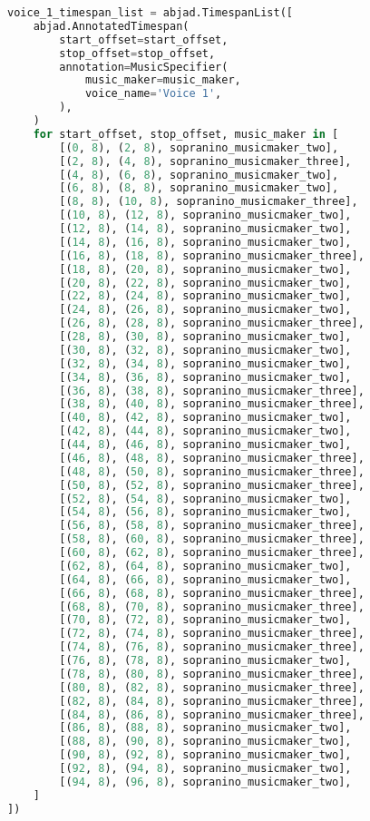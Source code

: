 \begin{lstlisting}[language=Python, caption=Invocation Source Code]
voice_1_timespan_list = abjad.TimespanList([
    abjad.AnnotatedTimespan(
        start_offset=start_offset,
        stop_offset=stop_offset,
        annotation=MusicSpecifier(
            music_maker=music_maker,
            voice_name='Voice 1',
        ),
    )
    for start_offset, stop_offset, music_maker in [
        [(0, 8), (2, 8), sopranino_musicmaker_two],
        [(2, 8), (4, 8), sopranino_musicmaker_three],
        [(4, 8), (6, 8), sopranino_musicmaker_two],
        [(6, 8), (8, 8), sopranino_musicmaker_two],
        [(8, 8), (10, 8), sopranino_musicmaker_three],
        [(10, 8), (12, 8), sopranino_musicmaker_two],
        [(12, 8), (14, 8), sopranino_musicmaker_two],
        [(14, 8), (16, 8), sopranino_musicmaker_two],
        [(16, 8), (18, 8), sopranino_musicmaker_three],
        [(18, 8), (20, 8), sopranino_musicmaker_two],
        [(20, 8), (22, 8), sopranino_musicmaker_two],
        [(22, 8), (24, 8), sopranino_musicmaker_two],
        [(24, 8), (26, 8), sopranino_musicmaker_two],
        [(26, 8), (28, 8), sopranino_musicmaker_three],
        [(28, 8), (30, 8), sopranino_musicmaker_two],
        [(30, 8), (32, 8), sopranino_musicmaker_two],
        [(32, 8), (34, 8), sopranino_musicmaker_two],
        [(34, 8), (36, 8), sopranino_musicmaker_two],
        [(36, 8), (38, 8), sopranino_musicmaker_three],
        [(38, 8), (40, 8), sopranino_musicmaker_three],
        [(40, 8), (42, 8), sopranino_musicmaker_two],
        [(42, 8), (44, 8), sopranino_musicmaker_two],
        [(44, 8), (46, 8), sopranino_musicmaker_two],
        [(46, 8), (48, 8), sopranino_musicmaker_three],
        [(48, 8), (50, 8), sopranino_musicmaker_three],
        [(50, 8), (52, 8), sopranino_musicmaker_three],
        [(52, 8), (54, 8), sopranino_musicmaker_two],
        [(54, 8), (56, 8), sopranino_musicmaker_two],
        [(56, 8), (58, 8), sopranino_musicmaker_three],
        [(58, 8), (60, 8), sopranino_musicmaker_three],
        [(60, 8), (62, 8), sopranino_musicmaker_three],
        [(62, 8), (64, 8), sopranino_musicmaker_two],
        [(64, 8), (66, 8), sopranino_musicmaker_two],
        [(66, 8), (68, 8), sopranino_musicmaker_three],
        [(68, 8), (70, 8), sopranino_musicmaker_three],
        [(70, 8), (72, 8), sopranino_musicmaker_two],
        [(72, 8), (74, 8), sopranino_musicmaker_three],
        [(74, 8), (76, 8), sopranino_musicmaker_three],
        [(76, 8), (78, 8), sopranino_musicmaker_two],
        [(78, 8), (80, 8), sopranino_musicmaker_three],
        [(80, 8), (82, 8), sopranino_musicmaker_three],
        [(82, 8), (84, 8), sopranino_musicmaker_three],
        [(84, 8), (86, 8), sopranino_musicmaker_three],
        [(86, 8), (88, 8), sopranino_musicmaker_two],
        [(88, 8), (90, 8), sopranino_musicmaker_two],
        [(90, 8), (92, 8), sopranino_musicmaker_two],
        [(92, 8), (94, 8), sopranino_musicmaker_two],
        [(94, 8), (96, 8), sopranino_musicmaker_two],
    ]
])


\end{lstlisting}

